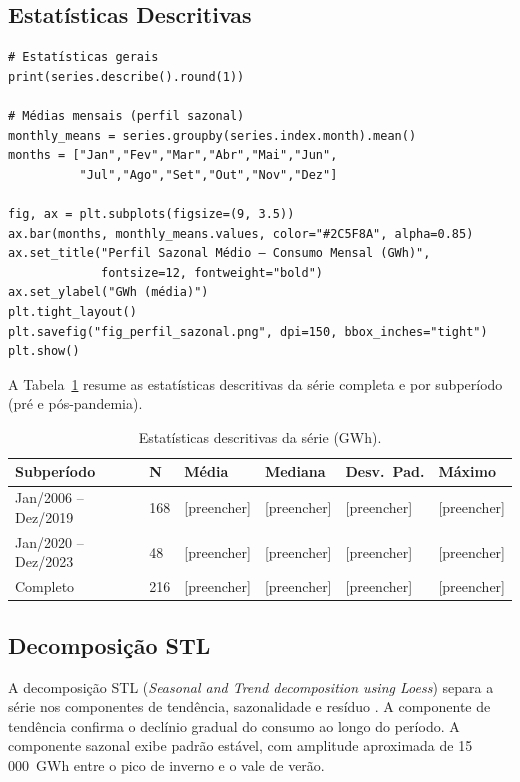 \documentclass[12pt, a4paper]{article}
\begin{document}
\subsection{Estatísticas Descritivas}

\begin{lstlisting}[caption={Estatísticas descritivas e sazonalidade mensal.},
                   label={lst:descritivas}]
# Estatísticas gerais
print(series.describe().round(1))

# Médias mensais (perfil sazonal)
monthly_means = series.groupby(series.index.month).mean()
months = ["Jan","Fev","Mar","Abr","Mai","Jun",
          "Jul","Ago","Set","Out","Nov","Dez"]

fig, ax = plt.subplots(figsize=(9, 3.5))
ax.bar(months, monthly_means.values, color="#2C5F8A", alpha=0.85)
ax.set_title("Perfil Sazonal Médio — Consumo Mensal (GWh)",
             fontsize=12, fontweight="bold")
ax.set_ylabel("GWh (média)")
plt.tight_layout()
plt.savefig("fig_perfil_sazonal.png", dpi=150, bbox_inches="tight")
plt.show()
\end{lstlisting}

A Tabela~\ref{tab:descritivas} resume as estatísticas descritivas da série completa
e por subperíodo (pré e pós-pandemia).

\begin{table}[H]
  \centering
  \caption{Estatísticas descritivas da série (GWh).}
  \label{tab:descritivas}
  \begin{tabularx}{\textwidth}{lXXXXX}
    \toprule
    \textbf{Subperíodo} & \textbf{N} & \textbf{Média} & \textbf{Mediana}
      & \textbf{Desv.\ Pad.} & \textbf{Máximo} \\
    \midrule
    Jan/2006 -- Dez/2019 & 168 & [preencher] & [preencher]
      & [preencher] & [preencher] \\
    Jan/2020 -- Dez/2023 & 48  & [preencher] & [preencher]
      & [preencher] & [preencher] \\
    Completo             & 216 & [preencher] & [preencher]
      & [preencher] & [preencher] \\
    \bottomrule
  \end{tabularx}
\end{table}

\subsection{Decomposição STL}

A decomposição STL (\textit{Seasonal and Trend decomposition using Loess}) separa a
série nos componentes de tendência, sazonalidade e resíduo \cite{SeriesTemporaisMoretti}.
A componente de tendência confirma o declínio gradual do consumo ao longo do período.
A componente sazonal exibe padrão estável, com amplitude aproximada de 15\,000~GWh
entre o pico de inverno e o vale de verão.
\end{document}
